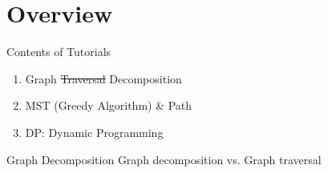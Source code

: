 \section{Overview}

\begin{frame}{Contents of Tutorials}
  \begin{enumerate}
    \item Graph \sout{Traversal} Decomposition
    \item MST (Greedy Algorithm) \& Path
    \item DP: Dynamic Programming
  \end{enumerate}
\end{frame}

\begin{frame}{Graph Decomposition}
  Graph decomposition vs. Graph traversal
\end{frame}
